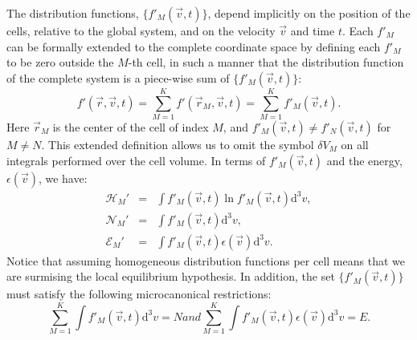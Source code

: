 The distribution functions, $\{f'_M(\vec{v},t)\}$, depend implicitly on the position of the cells,
relative to the global system, and on the velocity
$\vec{v}$ and time $t$. Each $f'_M$ can be formally extended to the complete coordinate space
by defining each $f'_M$ to be zero outside the $M$-th cell, in such a manner that
the distribution function of the complete system is a piece-wise sum
of $\{f'_M(\vec v,t)\}$:
%
\begin{equation}
   f'(\vec r,\vec v,t)=\sum_{M=1}^Kf'(\vec r_M,\vec v,t)=\sum_{M=1}^Kf'_M(\vec v,t).
\end{equation}
%
Here $\vec r_M$ is the center of the cell of index $M$, and $f'_M(\vec v,t)\neq f'_N(\vec v,t)$
for $M\neq N$. This extended definition
allows us to omit the symbol $\delta V_M$ on all integrals performed over the cell volume.
In terms of $f'_M(\vec{v},t)$ and the energy, $\epsilon(\vec{v})$, we have:
%
\begin{subequations}\label{eq:cellrestrictions}
\begin{eqnarray}
    \mathcal{H}_M' & = &  \int f'_M(\vec{v},t) \ln f'_{M}(\vec{v},t)
      \mathrm{d}^{3}v \label{eq:Hcell},\\
    \mathcal{N}_M' & = & \int f'_{M}(\vec{v} ,t) \mathrm{d}^{3}v,\label{eq:Ncell}\\
    \mathcal{E}_M' & = & \int f'_{M}(\vec{v},t)\epsilon(\vec{v}) \mathrm{d}^{3}v\label{eq:Ecell}.
\end{eqnarray}
\end{subequations}
%
Notice that assuming homogeneous distribution functions per cell means that we are surmising the 
local equilibrium hypothesis. In addition, the set $\{f'_{M}(\vec{v},t)\}$ must satisfy the following
microcanonical restrictions:
%
\begin{subequations}\label{eq:micro}
\begin{equation}\label{eq:micron}
    \sum_{M=1}^{K}\int f'_M(\vec{v},t)\mathrm{d}^3v =N
\end{equation}
and
\begin{equation}\label{eq:microe}
    \sum_{M=1}^{K}\int f'_M(\vec{v},t)\epsilon(\vec{v})\mathrm{d}^3v=E.
\end{equation}
\end{subequations}
%

